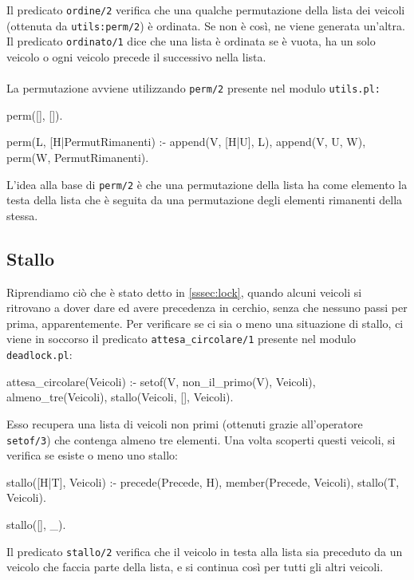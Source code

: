 Il predicato \texttt{ordine/2} verifica che una qualche permutazione della lista dei veicoli (ottenuta da \texttt{utils:perm/2}) è ordinata. Se non è così, ne viene generata un'altra. Il predicato \texttt{ordinato/1} dice che una lista è ordinata se è vuota, ha un solo veicolo o ogni veicolo precede il successivo nella lista.
\\\\
La permutazione avviene utilizzando \texttt{perm/2} presente nel modulo \texttt{utils.pl:}
\begin{verbatimtab}
perm([], []).
	
perm(L, [H|PermutRimanenti) :-
	append(V, [H|U], L),
	append(V, U, W),
	perm(W, PermutRimanenti).
\end{verbatimtab}

L'idea alla base di \texttt{perm/2} è che una permutazione della lista ha come elemento la testa della lista che è seguita da una permutazione degli elementi rimanenti della stessa.

\subsection{Stallo}
Riprendiamo ciò che è stato detto in \ref{sssec:lock}, quando alcuni veicoli si ritrovano a dover dare ed avere precedenza in cerchio, senza che nessuno passi per prima, apparentemente. Per verificare se ci sia o meno una situazione di stallo, ci viene in soccorso il predicato \texttt{attesa\_circolare/1} presente nel modulo \texttt{deadlock.pl}:

\begin{verbatimtab}
attesa_circolare(Veicoli) :-
	setof(V, non_il_primo(V), Veicoli),
	almeno_tre(Veicoli),
	stallo(Veicoli, [], Veicoli).
\end{verbatimtab}

Esso recupera una lista di veicoli non primi (ottenuti grazie all'operatore \texttt{setof/3}) che contenga almeno tre elementi. Una volta scoperti questi veicoli, si verifica se esiste o meno uno stallo:
\begin{verbatimtab}
stallo([H|T], Veicoli) :-
	precede(Precede, H),
	member(Precede, Veicoli),
	stallo(T, Veicoli).

stallo([], _).
\end{verbatimtab}

Il predicato \texttt{stallo/2} verifica che il veicolo in testa alla lista sia preceduto da un veicolo che faccia parte della lista, e si continua così per tutti gli altri veicoli.

